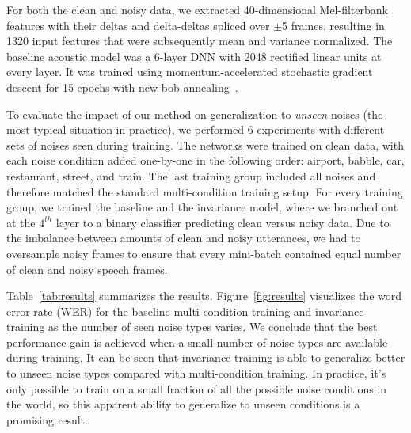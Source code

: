 \documentclass[a4paper]{article}
\begin{document}
For both the clean and noisy data, we extracted 40-dimensional Mel-filterbank features with their deltas and 
delta-deltas spliced over $\pm$5 frames, resulting in 1320 input 
features that were subsequently mean and variance normalized. The baseline
acoustic model was a 6-layer 
DNN with 2048 rectified linear units at every layer. It was trained using 
momentum-accelerated stochastic gradient descent for 15 epochs with new-bob 
annealing~\citep[the learning rate is halved if no improvement on the validation set, as in][]{morgan1995continuous,sainath2011making}.

To evaluate the impact of our method on generalization to \emph{unseen} noises (the
most typical situation in practice),
we performed 6 experiments with different sets of noises seen during training.
The networks were trained
on clean data, with each noise condition added one-by-one in the following order: airport, babble, car, 
restaurant, street, and train. The last training group included all noises and therefore matched the
standard multi-condition training setup. For every training group, we trained the
baseline and the invariance model, where we branched out at the $4^{th}$ layer to a
binary classifier predicting clean versus noisy data. Due to the imbalance between amounts of clean and
noisy utterances, we had to oversample noisy frames to ensure that every mini-batch contained
equal number of clean and noisy speech frames.

Table~\ref{tab:results} summarizes the results. Figure~\ref{fig:results} visualizes 
the word error rate (WER) for the baseline multi-condition training and invariance training 
as the number of seen noise types varies. We conclude that the best performance
gain is achieved when a small number of noise types are available during training. 
It can be seen that invariance training is able to generalize better to unseen 
noise types compared with multi-condition training.
In practice, it's only possible to train on a small fraction of all the possible
noise conditions in the world, so this apparent ability to generalize to unseen
conditions is a promising result.
\end{document}
